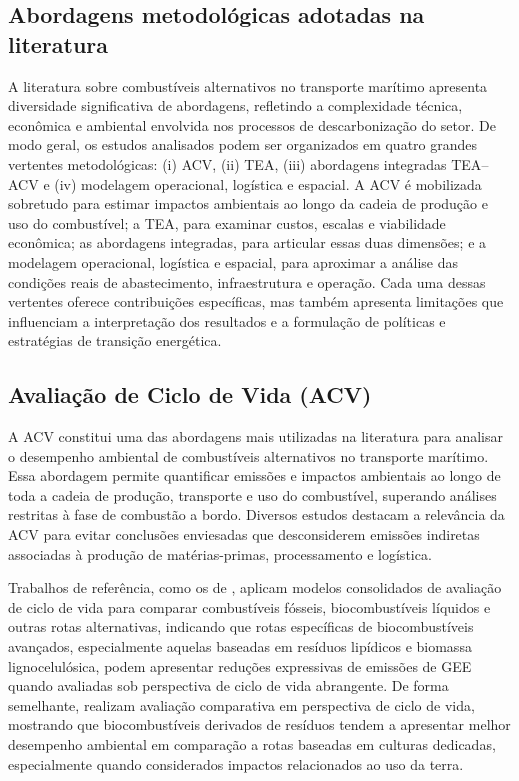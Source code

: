 \subsection{Abordagens metodológicas adotadas na literatura}
A literatura sobre combustíveis alternativos no transporte marítimo apresenta diversidade significativa de abordagens, refletindo a complexidade técnica, econômica e ambiental envolvida nos processos de descarbonização do setor. De modo geral, os estudos analisados podem ser organizados em quatro grandes vertentes metodológicas: (i) \gls{ACV}, (ii) \gls{TEA}, (iii) abordagens integradas \gls{TEA}--\gls{ACV} e (iv) modelagem operacional, logística e espacial. A \gls{ACV} é mobilizada sobretudo para estimar impactos ambientais ao longo da cadeia de produção e uso do combustível; a \gls{TEA}, para examinar custos, escalas e viabilidade econômica; as abordagens integradas, para articular essas duas dimensões; e a modelagem operacional, logística e espacial, para aproximar a análise das condições reais de abastecimento, infraestrutura e operação. Cada uma dessas vertentes oferece contribuições específicas, mas também apresenta limitações que influenciam a interpretação dos resultados e a formulação de políticas e estratégias de transição energética.

\subsection{Avaliação de Ciclo de Vida (ACV)}
A \gls{ACV} constitui uma das abordagens mais utilizadas na literatura para analisar o desempenho ambiental de combustíveis alternativos no transporte marítimo. Essa abordagem permite quantificar emissões e impactos ambientais ao longo de toda a cadeia de produção, transporte e uso do combustível, superando análises restritas à fase de combustão a bordo. Diversos estudos destacam a relevância da \gls{ACV} para evitar conclusões enviesadas que desconsiderem emissões indiretas associadas à produção de matérias-primas, processamento e logística.

Trabalhos de referência, como os de \citet{international_council_on_clean_transportation_potential_2021}, aplicam modelos consolidados de avaliação de ciclo de vida para comparar combustíveis fósseis, biocombustíveis líquidos e outras rotas alternativas, indicando que rotas específicas de biocombustíveis avançados, especialmente aquelas baseadas em resíduos lipídicos e biomassa lignocelulósica, podem apresentar reduções expressivas de emissões de \gls{GEE} quando avaliadas sob perspectiva de ciclo de vida abrangente. De forma semelhante, \citet{bilgili_comparative_2021} realizam avaliação comparativa em perspectiva de ciclo de vida, mostrando que biocombustíveis derivados de resíduos tendem a apresentar melhor desempenho ambiental em comparação a rotas baseadas em culturas dedicadas, especialmente quando considerados impactos relacionados ao uso da terra.

